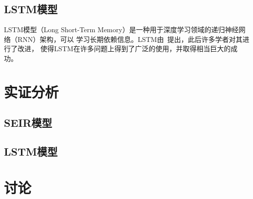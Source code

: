 \documentclass[lang=cn,11pt,a4paper,cite=authoryear]{elegantpaper}
\begin{document}
\subsection{LSTM模型}
LSTM模型（Long Short-Term Memory）是一种用于深度学习领域的递归神经网络（RNN）架构，可以
学习长期依赖信息。LSTM由~\cite{hochreiter1997lstm}提出，此后许多学者对其进行了改进，
使得LSTM在许多问题上得到了广泛的使用，并取得相当巨大的成功\citep{gers2000learning, 
graves2005bidirectional, graves2005framewise, schmidhuber2007training, 
bayer2009evolving, schaul2010pybrain, graves2013hybrid, bayer2014Learning}。

\section{实证分析}

\subsection{SEIR模型}

\subsection{LSTM模型}

\section{讨论}


\end{document}
